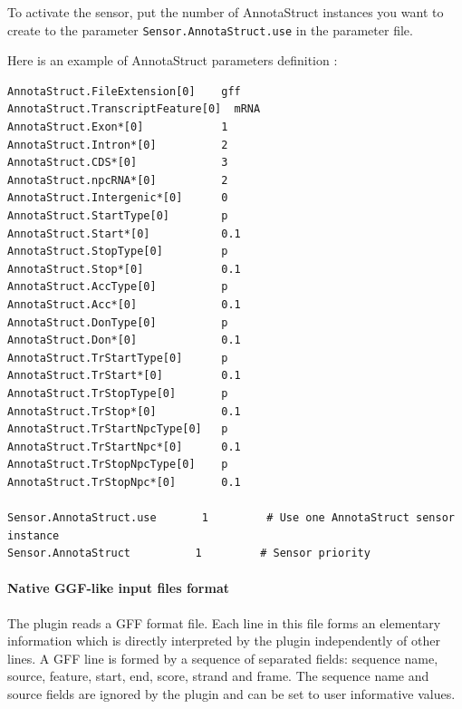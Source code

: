 To activate the sensor, put the number of AnnotaStruct instances you want to create to the parameter
\texttt{Sensor.AnnotaStruct.use} in the parameter file.

Here is an example of AnnotaStruct parameters definition :
\begin{Verbatim}[fontsize=\small]
AnnotaStruct.FileExtension[0]    gff
AnnotaStruct.TranscriptFeature[0]  mRNA
AnnotaStruct.Exon*[0]            1
AnnotaStruct.Intron*[0]          2
AnnotaStruct.CDS*[0]             3
AnnotaStruct.npcRNA*[0]          2
AnnotaStruct.Intergenic*[0]      0
AnnotaStruct.StartType[0]        p 
AnnotaStruct.Start*[0]           0.1
AnnotaStruct.StopType[0]         p 
AnnotaStruct.Stop*[0]            0.1
AnnotaStruct.AccType[0]          p 
AnnotaStruct.Acc*[0]             0.1
AnnotaStruct.DonType[0]          p 
AnnotaStruct.Don*[0]             0.1
AnnotaStruct.TrStartType[0]      p 
AnnotaStruct.TrStart*[0]         0.1
AnnotaStruct.TrStopType[0]       p 
AnnotaStruct.TrStop*[0]          0.1
AnnotaStruct.TrStartNpcType[0]   p
AnnotaStruct.TrStartNpc*[0]      0.1
AnnotaStruct.TrStopNpcType[0]    p
AnnotaStruct.TrStopNpc*[0]       0.1

Sensor.AnnotaStruct.use       1         # Use one AnnotaStruct sensor instance
Sensor.AnnotaStruct          1         # Sensor priority
\end{Verbatim}

\paragraph{Native GGF-like input files format}

The plugin reads a GFF format file. Each line in this file forms an
elementary information which is directly interpreted by the plugin
independently of other lines. A GFF line is formed by a sequence of
separated fields: sequence name, source, feature, start, end, score,
strand and frame. The sequence name and source fields are ignored by
the plugin and can be set to user informative values.

